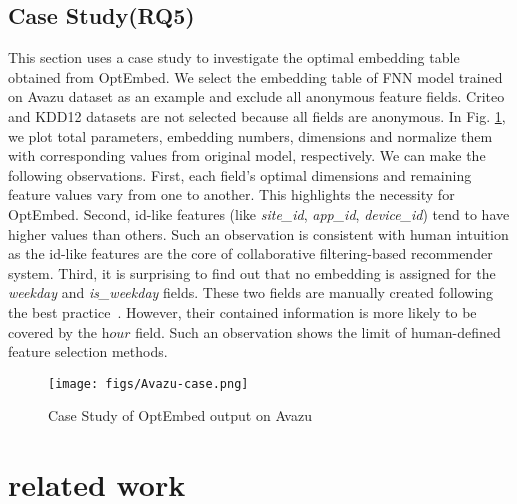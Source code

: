 \documentclass[sigconf]{acmart}
\begin{document}
\subsection{Case Study(RQ5)}
This section uses a case study to investigate the optimal embedding table obtained from OptEmbed. We select the embedding table of FNN model trained on Avazu dataset as an example and exclude all anonymous feature fields. Criteo and KDD12 datasets are not selected because all fields are anonymous. In Fig. \ref{fig:case}, we plot total parameters, embedding numbers, dimensions and normalize them with corresponding values from original model, respectively. We can make the following observations. First, each field's optimal dimensions and remaining feature values vary from one to another. This highlights the necessity for OptEmbed. Second, id-like features (like \textit{site\_id}, \textit{app\_id}, \textit{device\_id}) tend to have higher values than others. Such an observation is consistent with human intuition as the id-like features are the core of collaborative filtering-based recommender system. Third, it is surprising to find out that no embedding is assigned for the \textit{weekday} and \textit{is\_weekday} fields. These two fields are manually created following the best practice~\cite{fuxictr}. However, their contained information is more likely to be covered by the $\textit{hour}$ field. Such an observation shows the limit of human-defined feature selection methods.

\begin{figure}[!htbp]
    \centering
    \texttt{[image: figs/Avazu-case.png]}
    \vspace{-10pt}
    \caption{Case Study of OptEmbed output on Avazu}
    \label{fig:case}
    \vspace{-10pt}
\end{figure}















 \section{related work}
\label{sec:rw}
\end{document}
